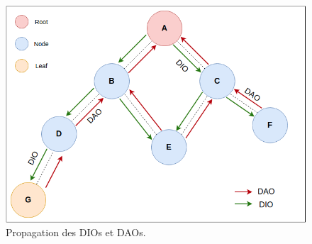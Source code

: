 \begin{figure}[H]
    \centering
    \includegraphics[scale=0.5]{res/pictures/dao-dio.drawio.png}
    \caption{Propagation des DIOs et DAOs.}
    \label{fig:state-dio-dao}
\end{figure}



